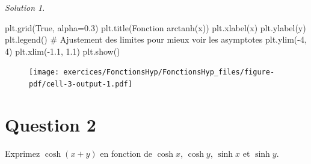 \documentclass[
  12pt,
  letterpaper,
]{book}
\newenvironment{Shaded}{}{}
\newcommand{\CommentTok}[1]{\textcolor[rgb]{0.42,0.45,0.49}{#1}}
\newcommand{\DecValTok}[1]{\textcolor[rgb]{0.00,0.36,0.77}{#1}}
\newcommand{\FloatTok}[1]{\textcolor[rgb]{0.00,0.36,0.77}{#1}}
\newcommand{\NormalTok}[1]{\textcolor[rgb]{0.14,0.16,0.18}{#1}}
\newcommand{\OperatorTok}[1]{\textcolor[rgb]{0.14,0.16,0.18}{#1}}
\newcommand{\StringTok}[1]{\textcolor[rgb]{0.01,0.18,0.38}{#1}}
\newcommand{\VariableTok}[1]{\textcolor[rgb]{0.89,0.38,0.04}{#1}}
\theoremstyle{remark}
\newtheorem*{solution}{Solution}
\begin{document}
\begin{enumerate}
\begin{solution}
\begin{Shaded}
\begin{Highlighting}[]
\NormalTok{plt.grid(}\VariableTok{True}\NormalTok{, alpha}\OperatorTok{=}\FloatTok{0.3}\NormalTok{)}
\NormalTok{plt.title(}\StringTok{\textquotesingle{}Fonction arctanh(x)\textquotesingle{}}\NormalTok{)}
\NormalTok{plt.xlabel(}\StringTok{\textquotesingle{}x\textquotesingle{}}\NormalTok{)}
\NormalTok{plt.ylabel(}\StringTok{\textquotesingle{}y\textquotesingle{}}\NormalTok{)}
\NormalTok{plt.legend()}
\CommentTok{\# Ajustement des limites pour mieux voir les asymptotes}
\NormalTok{plt.ylim(}\OperatorTok{{-}}\DecValTok{4}\NormalTok{, }\DecValTok{4}\NormalTok{)}
\NormalTok{plt.xlim(}\OperatorTok{{-}}\FloatTok{1.1}\NormalTok{, }\FloatTok{1.1}\NormalTok{)}
\NormalTok{plt.show()}
\end{Highlighting}
\end{Shaded}

  \begin{figure}[H]

  {\centering \texttt{[image: exercices/FonctionsHyp/FonctionsHyp\_files/figure-pdf/cell-3-output-1.pdf]}

  }

  \end{figure}

  \end{solution}
\end{enumerate}

\hypertarget{question-2-3}{%
\section{Question 2}\label{question-2-3}}

Exprimez \(\cosh(x+y)\) en fonction de \(\cosh x\), \(\cosh y\),
\(\sinh x\) et \(\sinh y\).
\end{document}
